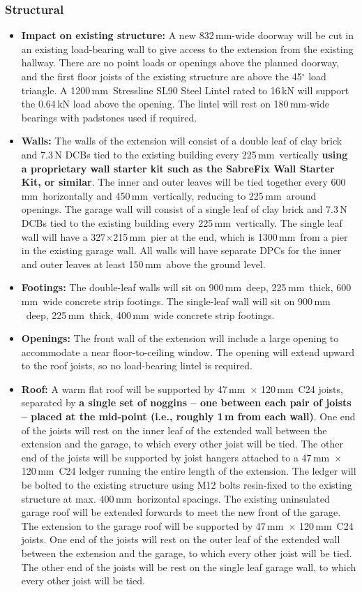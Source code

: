 \documentclass{extension}
\newcommand{\mm}{\,$\mathrm{mm}$}
\begin{document}
\subsubsection{Structural}
\begin{itemize}
  \item {\bf Impact on existing structure:} A new 832\mm -wide doorway will be cut in an existing load-bearing wall to give access to the extension from the existing hallway. There are no point loads or openings above the planned doorway, and the first floor joists of the existing structure are above the 45$^\circ$ load triangle. A 1200\mm\ Stressline SL90 Steel Lintel rated to 16\,kN will support the 0.64\,kN load above the opening. The lintel will rest on 180\mm -wide bearings with padstones used if required.
  \item {\bf Walls:} The walls of the extension will consist of a double leaf of clay brick and 7.3\,N DCBs tied to the existing building every 225\mm\ vertically {\bf using a proprietary wall starter kit such as the SabreFix Wall Starter Kit, or similar}.\cite{starterkit} The inner and outer leaves will be tied together every 600\mm\ horizontally and 450\mm\ vertically, reducing to 225\mm\ around openings. The garage wall will consist of a single leaf of clay brick and 7.3\,N DCBs tied to the existing building every 225\mm\ vertically. The single leaf wall will have a 327$\times$215\mm\ pier at the end, which is 1300\mm\ from a pier in the existing garage wall. All walls will have separate DPCs for the inner and outer leaves at least 150\mm\ above the ground level.
  \item {\bf Footings:} The double-leaf walls will sit on 900\mm\ deep, 225\mm\ thick, 600\mm\ wide concrete strip footings. The single-leaf wall will sit on 900\mm\ deep, 225\mm\ thick, 400\mm\ wide concrete strip footings.
  \item {\bf Openings:} The front wall of the extension will include a large opening to accommodate a near floor-to-ceiling window. The opening will extend upward to the roof joists, so no load-bearing lintel is required.
  \item {\bf Roof:} A warm flat roof will be supported by 47\mm\ $\times$ 120\mm\ C24 joists, separated by {\bf a single set of noggins -- one between each pair of joists -- placed at the mid-point (i.e., roughly 1\,m from each wall)}. One end of the joists will rest on the inner leaf of the extended wall between the extension and the garage, to which every other joist will be tied. The other end of the joists will be supported by joist hangers attached to a 47\mm\ $\times$ 120\mm\ C24 ledger running the entire length of the extension. The ledger will be bolted to the existing structure using M12 bolts resin-fixed to the existing structure at max. 400\mm\ horizontal spacings. The existing uninsulated garage roof will be extended forwards to meet the new front of the garage. The extension to the garage roof will be supported by 47\mm\ $\times$ 120\mm\ C24 joists. One end of the joists will rest on the outer leaf of the extended wall between the extension and the garage, to which every other joist will be tied. The other end of the joists will be rest on the single leaf garage wall, to which every other joist will be tied.


\end{itemize}
\end{document}
